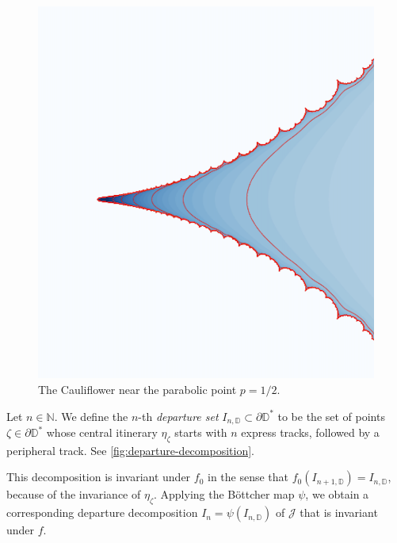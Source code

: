 \begin{figure}
    \centering
    \includegraphics[scale=1]{figures/cusp-without-axis.png}
    \caption{The Cauliflower near the parabolic point $p=1/2$.}
    \label{fig:my_figure}
\end{figure}

\begin{definition}\label{def:departure-set}

Let $n \in \mathbb N$. We define the $n$-th \emph{departure set} $I_{n, \mathbb D} \subset \partial \mathbb D ^*$ to be the set of points $\zeta \in \partial \mathbb D^*$ whose central itinerary $\eta_{\zeta}$ starts with $n$ express tracks, followed by a peripheral track.
See \cref{fig:departure-decomposition}.
\end{definition}

This decomposition is invariant under $f_0$ in the sense that $f_0(I_{n+1, \mathbb D})=I_{n, \mathbb D}$, because of the invariance of $\eta _\zeta$.
Applying the Böttcher map $\psi$, we obtain a corresponding departure decomposition $I_n = \psi(I_{n, \mathbb D})$ of $\mathcal J$ that is invariant under $f$.

